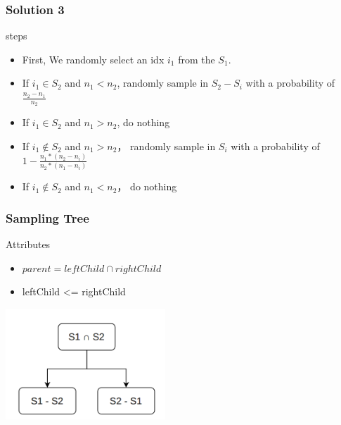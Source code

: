 \documentclass[notheorems, aspectratio=54]{beamer}
\begin{document}
\begin{frame}
    \frametitle{Solution 3}
        \begin{block} {steps}
            \begin{itemize}
                \item First, We randomly select an idx $i_1$ from the $S_1$.
                \item If $i_1 \in S_2$ and $n_1 < n_2$, randomly sample in $S_2-S_i$ with a probability of $\frac{n_2-n_1}{n_2}$ 
                \item If $i_1 \in S_2$ and $n_1 > n_2$, do nothing
                \item If $i_1 \notin S_2$ and $n_1 > n_2$， randomly sample in $S_i$ with a probability of $1-\frac{n_1*(n_2-n_i)}{n_2*(n_1-n_i)}$
                \item If $i_1 \notin S_2$ and $n_1 < n_2$， do nothing
            \end{itemize}
        \end{block}
\end{frame}

\begin{frame}
    \frametitle{Sampling Tree}
    \begin{block} {Attributes}
        \begin{itemize}
            \item $parent = {leftChild} \cap {rightChild}$
            \item leftChild <= rightChild
        \end{itemize}
    \end{block}
    \centering
    \includegraphics[width=6cm]{global_img_dir/SamplingTree.png}
\end{frame}
\end{document}
